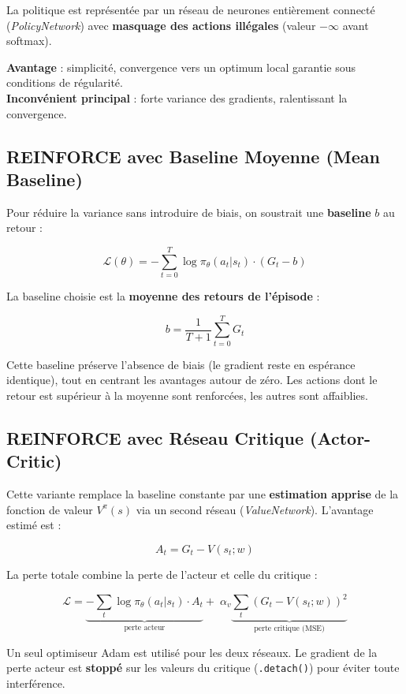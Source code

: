 \documentclass[12pt,a4paper]{article}
\begin{document}
La politique est représentée par un réseau de neurones entièrement connecté (\textit{PolicyNetwork}) avec \textbf{masquage des actions illégales} (valeur $-\infty$ avant softmax).

\textbf{Avantage} : simplicité, convergence vers un optimum local garantie sous conditions de régularité.\\
\textbf{Inconvénient principal} : forte variance des gradients, ralentissant la convergence.

\subsection{REINFORCE avec Baseline Moyenne (Mean Baseline)}

Pour réduire la variance sans introduire de biais, on soustrait une \textbf{baseline} $b$ au retour :

\[
\mathcal{L}(\theta) = -\sum_{t=0}^{T} \log \pi_\theta(a_t|s_t) \cdot (G_t - b)
\]

La baseline choisie est la \textbf{moyenne des retours de l'épisode} :

\[
b = \frac{1}{T+1} \sum_{t=0}^{T} G_t
\]

Cette baseline préserve l'absence de biais (le gradient reste en espérance identique), tout en centrant les avantages autour de zéro. Les actions dont le retour est supérieur à la moyenne sont renforcées, les autres sont affaiblies.

\subsection{REINFORCE avec Réseau Critique (Actor-Critic)}

Cette variante remplace la baseline constante par une \textbf{estimation apprise} de la fonction de valeur $V^\pi(s)$ via un second réseau (\textit{ValueNetwork}). L'avantage estimé est :

\[
A_t = G_t - V(s_t; w)
\]

La perte totale combine la perte de l'acteur et celle du critique :

\[
\mathcal{L} = \underbrace{-\sum_t \log \pi_\theta(a_t|s_t) \cdot A_t}_{\text{perte acteur}} + \; \alpha_v \underbrace{\sum_t \left(G_t - V(s_t; w)\right)^2}_{\text{perte critique (MSE)}}
\]

Un seul optimiseur Adam est utilisé pour les deux réseaux. Le gradient de la perte acteur est \textbf{stoppé} sur les valeurs du critique (\texttt{.detach()}) pour éviter toute interférence.
\end{document}

